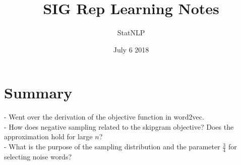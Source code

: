 \documentclass{article}
\title{SIG Rep Learning Notes}
\author{StatNLP}
\date{July 6 2018}
\begin{document}
\maketitle

\section{Summary}
- Went over the derivation of the objective function in word2vec. \\
- How does negative sampling related to the skipgram objective? Does the approximation hold for large $n$? \\
- What is the purpose of the sampling distribution and the parameter $\frac{3}{4}$ for selecting noise words?
\end{document}

